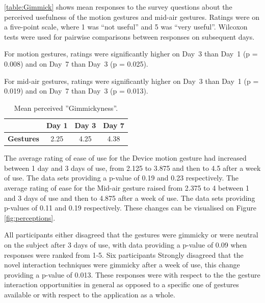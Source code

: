 \documentclass{l4proj}
\begin{document}
\autoref{table:Gimmick} shows mean responses to the survey questions about the perceived usefulness of the motion gestures and mid-air gestures. Ratings were on a five-point scale, where 1 was ``not useful'' and 5 was ``very useful''. Wilcoxon tests were used for pairwise comparisons between responses on subsequent days.

For motion gestures, ratings were significantly higher on Day~3 than Day~1 (p = 0.008) and on Day~7 than Day~3 (p = 0.025).

For mid-air gestures, ratings were significantly higher on Day~3 than Day~1 (p = 0.019) and on Day~7 than Day~3 (p = 0.013).

\begin{table}
\centering
\begin{tabular}{r c c c}
                              & \textbf{Day 1} & \textbf{Day 3} & \textbf{Day 7} \\ \toprule
    \textbf{Gestures} & 2.25           & 4.25           & 4.38 \\ \bottomrule
\end{tabular}
\caption{Mean perceived ''Gimmickyness''.}
\label{table:Gimmick}
\end{table}


The average rating of ease of use for the Device motion gesture had increased between 1 day and 3 days of use, from 2.125 to 3.875 and then to 4.5 after a week of use. The data sets providing a p-value of 0.19 and 0.23 respectively. The average rating of ease for the Mid-air gesture raised from 2.375 to 4 between 1 and 3 days of use and then to 4.875 after a week of use. The data sets providing p-values of 0.11 and 0.19 respectively. These changes can be visualised on Figure \ref{fig:perceptions}.

All participants either disagreed that the gestures were gimmicky or were neutral on the subject after 3 days of use, with data providing a p-value of 0.09 when responses were ranked from 1-5. Six participants Strongly disagreed that the novel interaction techniques were gimmicky after a week of use, this change providing a p-value of 0.013. These responses were with respect to the the gesture interaction opportunities in general as opposed to a specific one of gestures available or with respect to the application as a whole.
\end{document}
